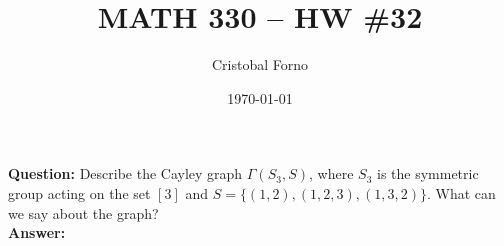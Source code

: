 \documentclass[12pt]{article}
\title{MATH 330 -- HW \#32}
\author{Cristobal Forno}
\date{\today}
\begin{document}
\maketitle
\textbf{Question:} Describe the Cayley graph $\Gamma(S_3,S)$, where $S_3$ is the
symmetric group acting on the set $[3]$ and $S=\{(1,2),(1,2,3),(1,3,2)\}$. What
can we say about the graph? \\

\textbf{Answer:} 
\end{document}
